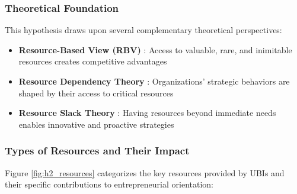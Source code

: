 \documentclass[../Main.tex]{subfiles}
\begin{document}
    \subsubsection{Theoretical Foundation}
    This hypothesis draws upon several complementary theoretical perspectives:

    \begin{itemize}
        \item \textbf{Resource-Based View (RBV)} \autocite{barney1991firm}: Access to valuable, rare, and inimitable resources creates competitive advantages
        \item \textbf{Resource Dependency Theory} \autocite{pfeffer1978external}: Organizations' strategic behaviors are shaped by their access to critical resources
        \item \textbf{Resource Slack Theory} \autocite{cyert1963behavioral}: Having resources beyond immediate needs enables innovative and proactive strategies
    \end{itemize}

    \subsubsection{Types of Resources and Their Impact}
    Figure \ref{fig:h2_resources} categorizes the key resources provided by UBIs and their specific contributions to entrepreneurial orientation:
\end{document}
